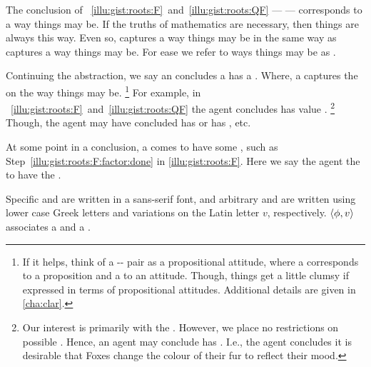 \begin{note}
  The conclusion of ~\ref{illu:gist:roots:F}~and~\ref{illu:gist:roots:QF} --- \propM{\rootsCon{}} --- corresponds to a way things may be.
  If the truths of mathematics are necessary, then things are always this way.
  Even so, \propM{\rootsCon{}} captures a way things may be in the same way as  captures a way things may be.
  For ease we refer to ways things may be as \emph{}.

  Continuing the abstraction, we say an \agents{} concludes a  has a \emph{}.
  Where, a  captures the \agpe{} on the way things may be.%
  \footnote{
    If it helps, think of a -- pair as a propositional attitude, where a  corresponds to a proposition and a  to an attitude.
    Though, things get a little clumsy if expressed in terms of propositional attitudes.
    Additional details are given in \autoref{cha:clar}.
  }
  For example, in ~\ref{illu:gist:roots:F}~and~\ref{illu:gist:roots:QF} the agent concludes \propM{\rootsCon{}} has value .%
  \footnote{
    Our interest is primarily with the \val{} .
    However, we place no restrictions on possible .
    Hence, an agent may conclude  has \val{} .
    I.e., the agent concludes it is desirable that Foxes change the colour of their fur to reflect their mood.
  }
  Though, the agent may have concluded \propM{\rootsCon{}} has \val{}  or \propM{\rootsConBad{}} has \val{} , etc.

  At some point in a conclusion, a \prop{} comes to have some \val{}, such as Step~\ref{illu:gist:roots:F:factor:done} in \autoref{illu:gist:roots:F}.
  Here we say the agent \emph{\evals{}} the \prop{} to have the \val{}.
\end{note}


\begin{note}
  \color{blue}
  Specific  and  are written in a \textsf{sans-serif} font, and arbitrary \prop{} and \val{} are written using lower case Greek letters and variations on the Latin letter \(v\), respectively.
  \(\langle\phi, v\rangle\) associates a  and a .
\end{note}


